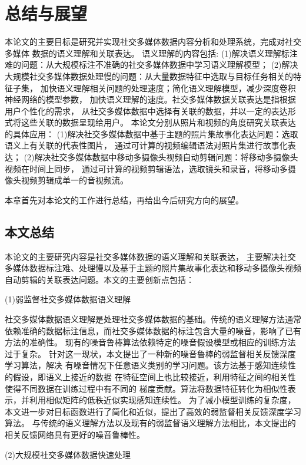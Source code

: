 \documentclass[doctor]{ustcthesis}
\begin{document}
\chapter{总结与展望}
本论文的主要目标是研究并实现社交多媒体数据内容分析和处理系统，完成对社交多媒体
数据的语义理解和关联表达。
语义理解的内容包括:
(1)解决语义理解标注难的问题：从大规模标注不准确的社交多媒体数据中学习语义理解模型；
(2)解决大规模社交多媒体数据处理慢的问题：从大量数据特征中选取与目标任务相关的特征子集，
加快语义理解相关问题的处理速度；简化语义理解模型，减少深度卷积神经网络的模型参数，
加快语义理解的速度。社交多媒体数据关联表达是指根据用户个性化的需求，
从社交多媒体数据中选择有关联的数据，并以一定的表达形式将这些关联的数据呈现给用户。
本论文分别从照片和视频的角度研究关联表达的具体应用：
(1)解决社交多媒体数据中基于主题的照片集故事化表达问题：选取语义上有关联的代表性图片，
通过可计算的视频编辑语法对照片集进行故事化表达；
(2)解决社交多媒体数据中移动多摄像头视频自动剪辑问题：将移动多摄像头视频在时间上同步，
通过可计算的视频剪辑语法，选取镜头和录音，将移动多摄像头视频剪辑成单一的音视频流。

本章首先对本论文的工作进行总结，再给出今后研究方向的展望。

\vspace{-1em}
\section{本文总结}
本论文的主要研究内容是社交多媒体数据的语义理解和关联表达，
主要解决社交多媒体数据标注难、处理慢以及基于主题的照片集故事化表达和移动多摄像头视频
自动剪辑的关联表达问题。本文的主要创新点包括：

(1)弱监督社交多媒体数据语义理解

社交多媒体数据语义理解是处理社交多媒体数据的基础。传统的语义理解方法通常
依赖准确的数据标注信息，而社交多媒体数据的标注包含大量的噪音，影响了已有方法的准确性。
现有的噪音鲁棒算法依赖特定的噪音假设模型或相应的训练方法过于复杂。
针对这一现状，本文提出了一种新的噪音鲁棒的弱监督相关反馈深度学习算法，解决
有噪音情况下任意语义类别的学习问题。该方法基于感知连续性的假设，即语义上接近的数据
在特征空间上也比较接近，利用特征之间的相关性使得不同数据在训练过程中有不同的
梯度贡献。算法将数据特征转化为相似性表示，并利用相似矩阵的低秩近似实现感知连续性。
为了减小模型训练的复杂度，本文进一步对目标函数进行了简化和近似，提出了高效的弱监督相关反馈深度学习算法。
与传统的语义理解方法以及现有的弱监督语义理解方法相比，本文提出的相关反馈网络具有更好的噪音鲁棒性。

(2)大规模社交多媒体数据快速处理
\end{document}
